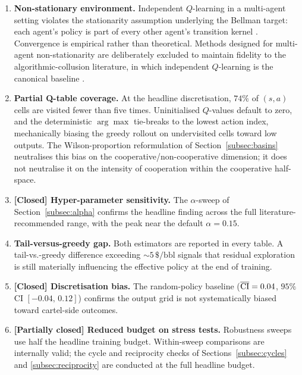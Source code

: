 \begin{enumerate}\itemsep2pt

  \item \textbf{Non-stationary environment.} Independent
        $Q$-learning in a multi-agent setting violates the
        stationarity assumption underlying the Bellman target:
        each agent's policy is part of every other agent's
        transition kernel \citep{claus1998, hernandez2017,
        yang2020}. Convergence is empirical rather than
        theoretical. Methods designed for multi-agent
        non-stationarity \citep{foerster2017, lowe2017,
        lanctot2017} are deliberately excluded to maintain
        fidelity to the algorithmic-collusion literature, in
        which independent $Q$-learning is the canonical
        baseline \citep{calvano2020}.

  \item \textbf{Partial Q-table coverage.} At the headline
        discretisation, $74\%$ of $(s,a)$ cells are visited
        fewer than five times. Uninitialised $Q$-values default
        to zero, and the deterministic $\arg\max$ tie-breaks to
        the lowest action index, mechanically biasing the greedy
        rollout on undervisited cells toward low outputs. The
        Wilson-proportion reformulation of
        Section~\ref{subsec:basins} neutralises this bias on the
        cooperative/non-cooperative dimension; it does not
        neutralise it on the intensity of cooperation within the
        cooperative half-space.

  \item \textbf{[Closed] Hyper-parameter sensitivity.} The
        $\alpha$-sweep of Section~\ref{subsec:alpha} confirms the
        headline finding across the full literature-recommended
        range, with the peak near the default $\alpha = 0.15$.

  \item \textbf{Tail-versus-greedy gap.} Both estimators are
        reported in every table. A tail-vs.-greedy difference
        exceeding ${\sim}5\,\$\text{/bbl}$ signals that residual
        exploration is still materially influencing the effective
        policy at the end of training.

  \item \textbf{[Closed] Discretisation bias.} The random-policy
        baseline ($\overline{\mathrm{CI}} = 0.04$, $95\%$ CI $[-0.04,\,0.12]$)
        confirms the output grid is not systematically biased
        toward cartel-side outcomes.

  \item \textbf{[Partially closed] Reduced budget on stress
        tests.} Robustness sweeps use half the headline training
        budget. Within-sweep comparisons are internally valid;
        the cycle and reciprocity checks of
        Sections~\ref{subsec:cycles} and
        \ref{subsec:reciprocity} are conducted at the full
        headline budget.


\end{enumerate}
